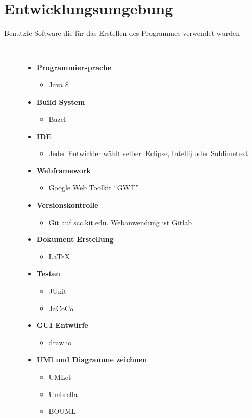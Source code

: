 \documentclass[parskip=full,11pt,twoside]{scrartcl}
\begin{document}


\section{Entwicklungsumgebung}
  \begin{description}
	\item[Benutzte Software die für das Erstellen des Programmes verwendet wurden]~\par
	\begin{itemize}
		\item \textbf{Programmiersprache}
		\begin{itemize}
			\item Java 8
		\end{itemize}
		\item \textbf{Build System}
		\begin{itemize}
			\item Bazel
		\end{itemize}
		\item \textbf{IDE}
		\begin{itemize}
			\item Jeder Entwickler wählt selber. Eclipse, Intellij oder Sublimetext
		\end{itemize}
		\item \textbf{Webframework}
		\begin{itemize}
			\item Google Web Toolkit \enquote{GWT}
		\end{itemize}
		\item \textbf{Versionskontrolle}
		\begin{itemize}
			\item Git auf scc.kit.edu. Webanwendung ist Gitlab
		\end{itemize}
		\item \textbf{Dokument Erstellung}
		\begin{itemize}
			\item LaTeX
		\end{itemize}
		\item \textbf{Testen}
		\begin{itemize}
			\item JUnit
			\item JaCoCo
		\end{itemize}
		\item \textbf{GUI Entwürfe}
			\begin{itemize}
				\item draw.io
			\end{itemize}
		\item \textbf{UMl und Diagramme zeichnen}
			\begin{itemize}
				\item UMLet
				\item Umbrella
				\item BOUML
				

\end{itemize}
\end{itemize}
\end{description}
\end{document}
